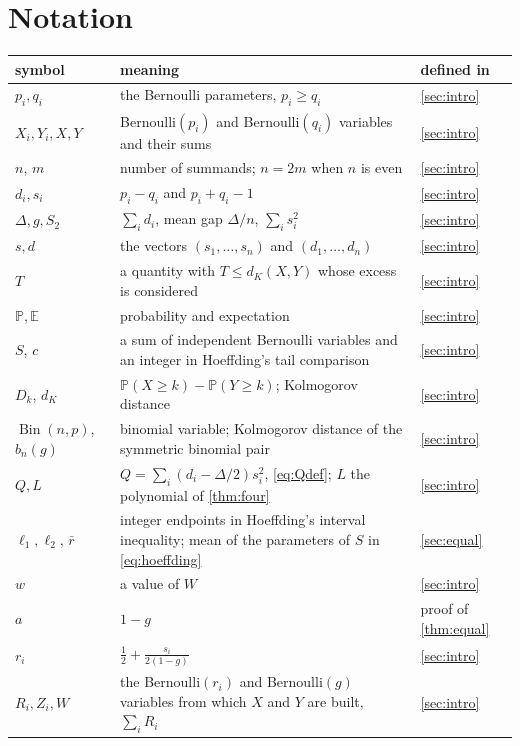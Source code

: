 \documentclass[11pt,a4paper]{article}
\numberwithin{equation}{section}
\theoremstyle{remark}
\newcommand{\Pp}{\mathbb P}
\newcommand{\E}{\mathbb E}
\newcommand{\Bin}{\operatorname{Bin}}
\begin{document}
\section{Notation}\label{app:notation}
\begin{center}
\small
\begin{tabular}{p{}p{}p{}}
\toprule
symbol & meaning & defined in\\
\midrule
$p_i,q_i$ & the Bernoulli parameters, $p_i\ge q_i$ & \cref{sec:intro}\\
$X_i,Y_i,X,Y$ & Bernoulli$(p_i)$ and Bernoulli$(q_i)$ variables and their sums & \cref{sec:intro}\\
$n$, $m$ & number of summands; $n=2m$ when $n$ is even & \cref{sec:intro}\\
$d_i,s_i$ & $p_i-q_i$ and $p_i+q_i-1$ & \cref{sec:intro}\\
$\Delta,g,S_2$ & $\sum_id_i$, mean gap $\Delta/n$, $\sum_is_i^2$ & \cref{sec:intro}\\
$s,d$ & the vectors $(s_1,\dots,s_n)$ and $(d_1,\dots,d_n)$ & \cref{sec:intro}\\
$T$ & a quantity with $T\le d_K(X,Y)$ whose excess is considered & \cref{sec:intro}\\
$\Pp,\E$ & probability and expectation & \cref{sec:intro}\\
$S$, $c$ & a sum of independent Bernoulli variables and an integer in Hoeffding's tail comparison & \cref{sec:intro}\\
$D_k$, $d_K$ & $\Pp(X\ge k)-\Pp(Y\ge k)$; Kolmogorov distance & \cref{sec:intro}\\
$\Bin(n,p)$, $b_n(g)$ & binomial variable; Kolmogorov distance of the symmetric binomial pair & \cref{sec:intro}\\
$Q,L$ & $Q=\sum_i(d_i-\Delta/2)s_i^2$, \eqref{eq:Qdef}; $L$ the polynomial of \cref{thm:four} & \cref{sec:intro}\\
$\ell_1,\ell_2$, $\bar r$ & integer endpoints in Hoeffding's interval inequality; mean of the parameters of $S$ in \eqref{eq:hoeffding} & \cref{sec:equal}\\
$w$ & a value of $W$ & \cref{sec:intro}\\
$a$ & $1-g$ & proof of \cref{thm:equal}\\
$r_i$ & $\frac12+\frac{s_i}{2(1-g)}$ & \cref{sec:intro}\\
$R_i,Z_i,W$ & the Bernoulli$(r_i)$ and Bernoulli$(g)$ variables from which $X$ and $Y$ are built, $\sum_iR_i$ & \cref{sec:intro}\\

\end{tabular}
\end{center}
\end{document}
